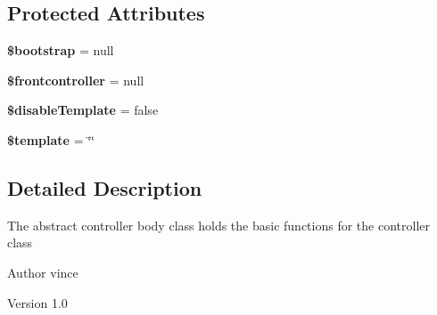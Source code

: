 \subsection*{Protected Attributes}
\begin{DoxyCompactItemize}
\item 
\hypertarget{class_anemo_1_1_controller_1_1_controller_abstract_a32a998e070639674077839a3ebeb20d8}{
{\bfseries \$bootstrap} = null}
\label{class_anemo_1_1_controller_1_1_controller_abstract_a32a998e070639674077839a3ebeb20d8}

\item 
\hypertarget{class_anemo_1_1_controller_1_1_controller_abstract_a63f8c1a24d55e25a02e7dfd2525de6ba}{
{\bfseries \$frontcontroller} = null}
\label{class_anemo_1_1_controller_1_1_controller_abstract_a63f8c1a24d55e25a02e7dfd2525de6ba}

\item 
\hypertarget{class_anemo_1_1_controller_1_1_controller_abstract_aff726c3b22c65e82ff58fd605ef95072}{
{\bfseries \$disableTemplate} = false}
\label{class_anemo_1_1_controller_1_1_controller_abstract_aff726c3b22c65e82ff58fd605ef95072}

\item 
\hypertarget{class_anemo_1_1_controller_1_1_controller_abstract_aa3e9534005fd516d941f6a5569896e01}{
{\bfseries \$template} = \char`\"{}\char`\"{}}
\label{class_anemo_1_1_controller_1_1_controller_abstract_aa3e9534005fd516d941f6a5569896e01}

\end{DoxyCompactItemize}


\subsection{Detailed Description}
The abstract controller body class holds the basic functions for the controller class  \begin{DoxyAuthor}{Author}
vince 
\end{DoxyAuthor}
\begin{DoxyVersion}{Version}
1.0 
\end{DoxyVersion}


